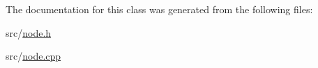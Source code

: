 The documentation for this class was generated from the following files\-:\begin{DoxyCompactItemize}
\item 
src/\hyperlink{node_8h}{node.\-h}\item 
src/\hyperlink{node_8cpp}{node.\-cpp}\end{DoxyCompactItemize}
